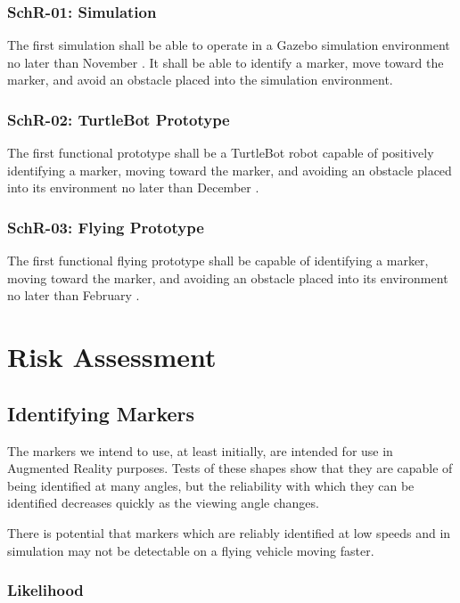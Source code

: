 \documentclass{article}
\begin{document}
		\subsubsection{SchR-01: Simulation}
		
		The first simulation shall be able to operate in a Gazebo simulation environment no later than November . It shall be able to identify a marker, move toward the marker, and avoid an obstacle placed into the simulation environment.
		
		\subsubsection{SchR-02: TurtleBot Prototype}
		
		The first functional prototype shall be a TurtleBot robot capable of positively identifying a marker, moving toward the marker, and avoiding an obstacle placed into its environment no later than December .
		
		\subsubsection{SchR-03: Flying Prototype}
		
		The first functional flying prototype shall be capable of identifying a marker, moving toward the marker, and avoiding an obstacle placed into its environment no later than February  .

\section{Risk Assessment}

	\subsection{Identifying Markers}
	
	The markers we intend to use, at least initially, are intended for use in Augmented Reality purposes. Tests of these shapes show that they are capable of being identified at many angles, but the reliability with which they can be identified decreases quickly as the viewing angle changes. 
	
	There is potential that markers which are reliably identified at low speeds and in simulation may not be detectable on a flying vehicle moving faster.
	
		\subsubsection{Likelihood}
 
\end{document}
